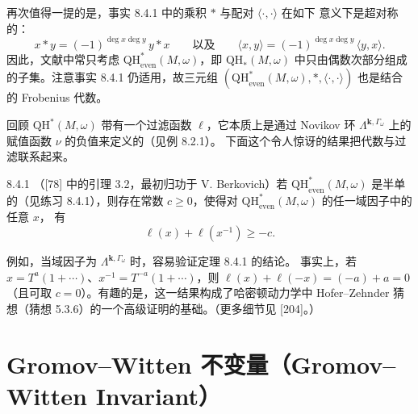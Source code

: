 再次值得一提的是，事实 8.4.1 中的乘积 $*$ 与配对 $\langle\cdot,\cdot\rangle$ 在如下
意义下是超对称的：
\[
  x*y=(-1)^{\deg x\deg y}\,y*x
  \qquad\text{以及}\qquad
  \langle x,y\rangle=(-1)^{\deg x\deg y}\,\langle y,x\rangle .
\]
因此，文献中常只考虑 $\mathrm{QH}^*_{\mathrm{even}}(M,\omega)$，即
$\mathrm{QH}_*(M,\omega)$ 中只由偶数次部分组成的子集。注意事实 8.4.1 仍适用，故三元组
$(\mathrm{QH}^*_{\mathrm{even}}(M,\omega),*,\langle\cdot,\cdot\rangle)$ 也是结合的
Frobenius 代数。

回顾 $\mathrm{QH}^*(M,\omega)$ 带有一个过滤函数 $\ell$，它本质上是通过 Novikov 环
$\Lambda^{\mathbf{k},\Gamma_\omega}$ 上的赋值函数 $\nu$ 的负值来定义的（见例 8.2.1）。
下面这个令人惊讶的结果把代数与过滤联系起来。

\begin{wthm}{8.4.1}
（[78] 中的引理 3.2，最初归功于 V. Berkovich）若
$\mathrm{QH}^*_{\mathrm{even}}(M,\omega)$ 是半单的（见练习 8.4.1），则存在常数
$c\ge0$，使得对 $\mathrm{QH}^*_{\mathrm{even}}(M,\omega)$ 的任一域因子中的任意 $x$，
有
\[
  \ell(x)+\ell(x^{-1})\ge-c .
\]
\end{wthm}

例如，当域因子为 $\Lambda^{\mathbf{k},\Gamma_\omega}$ 时，容易验证定理 8.4.1 的结论。
事实上，若 $x=T^a(1+\cdots)$、$x^{-1}=T^{-a}(1+\cdots)$，则
$\ell(x)+\ell(-x)=(-a)+a=0$（且可取 $c=0$）。有趣的是，这一结果构成了哈密顿动力学中
Hofer--Zehnder 猜想（猜想 5.3.6）的一个高级证明的基础。（更多细节见 [204]。）

\section{Gromov--Witten 不变量（Gromov–Witten Invariant）}

